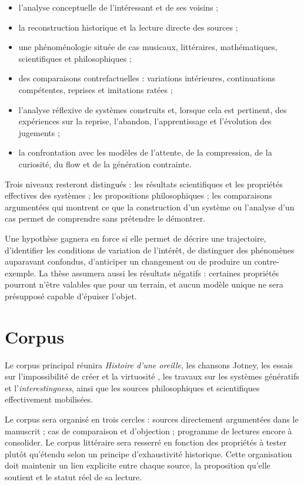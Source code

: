 \documentclass[11pt,a4paper]{article}
\begin{document}
\begin{itemize}
  \item l'analyse conceptuelle de l'intéressant et de ses voisins ;
  \item la reconstruction historique et la lecture directe des sources ;
  \item une phénoménologie située de cas musicaux, littéraires, mathématiques,
        scientifiques et philosophiques ;
  \item des comparaisons contrefactuelles : variations intérieures,
        continuations compétentes, reprises et imitations ratées ;
  \item l'analyse réflexive de systèmes construits et, lorsque cela est
        pertinent, des expériences sur la reprise, l'abandon, l'apprentissage
        et l'évolution des jugements ;
  \item la confrontation avec les modèles de l'attente, de la compression, de
        la curiosité, du flow et de la génération contrainte.
\end{itemize}

Trois niveaux resteront distingués : les résultats scientifiques et les
propriétés effectives des systèmes ; les propositions philosophiques ; les
comparaisons argumentées qui montrent ce que la construction d'un système ou
l'analyse d'un cas permet de comprendre sans prétendre le démontrer.

Une hypothèse gagnera en force si elle permet de décrire une trajectoire,
d'identifier les conditions de variation de l'intérêt, de distinguer des
phénomènes auparavant confondus, d'anticiper un changement ou de produire un
contre-exemple. La thèse assumera aussi les résultats négatifs : certaines
propriétés pourront n'être valables que pour un terrain, et aucun modèle unique
ne sera présupposé capable d'épuiser l'objet.

\section{Corpus}

Le corpus principal réunira \emph{Histoire d'une oreille}, les chansons Jotney,
les essais sur l'impossibilité de créer et la virtuosité
\parencite{pachet2018oreille,pachet2026impossibilite,pachet2027virtuosite}, les
travaux sur les systèmes génératifs et l'\emph{interestingness}, ainsi que les
sources philosophiques et scientifiques effectivement mobilisées.

Le corpus sera organisé en trois cercles : sources directement argumentées dans
le manuscrit ; cas de comparaison et d'objection ; programme de lectures encore
à consolider. Le corpus littéraire sera resserré en fonction des propriétés à
tester plutôt qu'étendu selon un principe d'exhaustivité historique. Cette
organisation doit maintenir un lien explicite entre chaque source, la
proposition qu'elle soutient et le statut réel de sa lecture.
\end{document}
